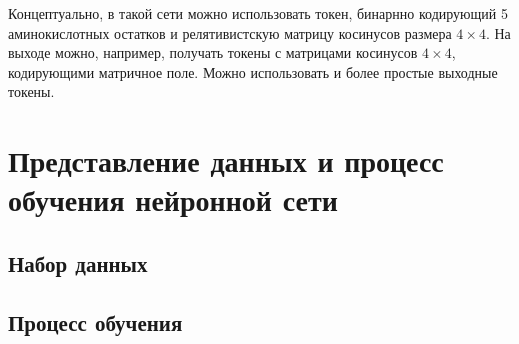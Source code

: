 Концептуально, в такой сети можно использовать токен, бинарнно кодирующий 5 аминокислотных остатков и релятивистскую матрицу косинусов размера $4\times4$. На выходе можно, например, получать токены с матрицами косинусов $4\times4$, кодирующими матричное поле. Можно использовать и более простые выходные токены.

\section{Представление данных и процесс обучения нейронной сети}

\subsection{Набор данных}

\subsection{Процесс обучения}
